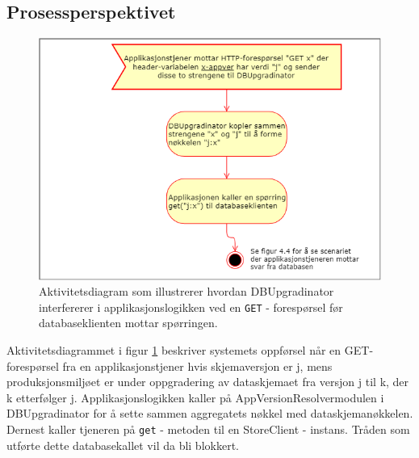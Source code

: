 \newpage

\subsection{Prosessperspektivet}

\begin{figure}[hbtp]
    \centering
    \includegraphics[scale=0.5]{fig/dbupgradinator-prosess-1.png}
    \caption{Aktivitetsdiagram som illustrerer hvordan DBUpgradinator interfererer i applikasjonslogikken ved en \texttt{GET} - forespørsel før databaseklienten mottar spørringen.}
    \label{fig7}
\end{figure}

Aktivitetsdiagrammet i figur \ref{fig7} beskriver systemets oppførsel når en GET-forespørsel fra en applikasjonstjener hvis skjemaversjon er j, mens produksjonsmiljøet er under oppgradering av dataskjemaet fra versjon j til k, der k etterfølger j. Applikasjonslogikken kaller på AppVersionResolver\-modulen i DBUpgradinator for å sette sammen aggregatets nøkkel med dataskjemanøkkelen. Dernest kaller tjeneren på \texttt{get} - metoden til en StoreClient - instans. Tråden som utførte dette databasekallet vil da bli blokkert.

\newpage

